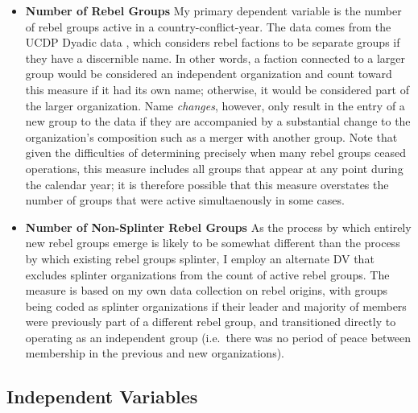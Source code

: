 \documentclass[12pt,]{book}
\providecommand{\tightlist}{%
  \setlength{\itemsep}{0pt}\setlength{\parskip}{0pt}}
\begin{document}
\begin{itemize}
\tightlist
\item
  \textbf{Number of Rebel Groups} My primary dependent variable is the
  number of rebel groups active in a country-conflict-year. The data
  comes from the UCDP Dyadic data \citep{Harbom2008, Melander2016},
  which considers rebel factions to be separate groups if they have a
  discernible name. In other words, a faction connected to a larger
  group would be considered an independent organization and count toward
  this measure if it had its own name; otherwise, it would be considered
  part of the larger organization. Name \emph{changes}, however, only
  result in the entry of a new group to the data if they are accompanied
  by a substantial change to the organization's composition such as a
  merger with another group. Note that given the difficulties of
  determining precisely when many rebel groups ceased operations, this
  measure includes all groups that appear at any point during the
  calendar year; it is therefore possible that this measure overstates
  the number of groups that were active simultaenously in some cases.
\item
  \textbf{Number of Non-Splinter Rebel Groups} As the process by which
  entirely new rebel groups emerge is likely to be somewhat different
  than the process by which existing rebel groups splinter, I employ an
  alternate DV that excludes splinter organizations from the count of
  active rebel groups. The measure is based on my own data collection on
  rebel origins, with groups being coded as splinter organizations if
  their leader and majority of members were previously part of a
  different rebel group, and transitioned directly to operating as an
  independent group (i.e.~there was no period of peace between
  membership in the previous and new organizations).
\end{itemize}

\subsection{Independent Variables}\label{independent-variables}
\end{document}
